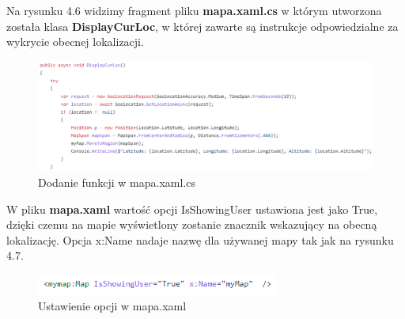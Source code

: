  Na rysunku 4.6 widzimy fragment pliku \textbf{mapa.xaml.cs} w którym utworzona została klasa \textbf{DisplayCurLoc}, w której zawarte są instrukcje odpowiedzialne za wykrycie obecnej lokalizacji.
 \newline
 \newline
 \begin{figure}[!htb]
 	\begin{center}
 		\includegraphics[width=18cm]{rys/mapa_xaml_cs.png}
 		\caption{Dodanie funkcji w mapa.xaml.cs}
 		\label{rys:rysunek017}
 	\end{center}
 \end{figure}
 
 W pliku \textbf{mapa.xaml} wartość opcji IsShowingUser ustawiona jest jako True, dzięki czemu na mapie wyświetlony zostanie znacznik wskazujący na obecną lokalizację. Opcja x:Name nadaje nazwę dla używanej mapy tak jak na rysunku 4.7.
 \newline
\begin{figure}[!htb]
	\begin{center}
		\includegraphics[width=8cm]{rys/mapa_xaml.png}
		\caption{Ustawienie opcji w mapa.xaml}
		\label{rys:rysunek018}
	\end{center}
\end{figure}
   

